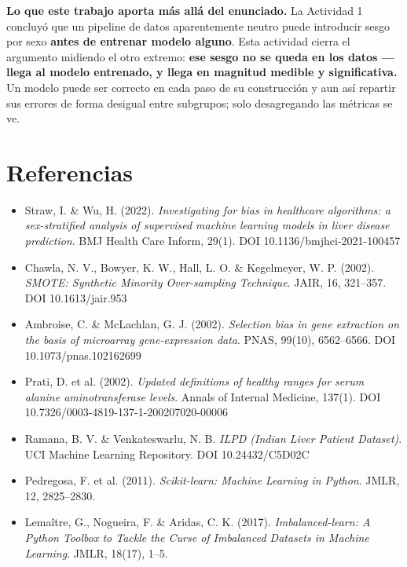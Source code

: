 \documentclass[10pt,a4paper]{article}
\begin{document}
\textbf{Lo que este trabajo aporta más allá del enunciado.} La Actividad 1 concluyó que un pipeline de datos aparentemente neutro puede introducir sesgo por sexo \textbf{antes de entrenar modelo alguno}. Esta actividad cierra el argumento midiendo el otro extremo: \textbf{ese sesgo no se queda en los datos --- llega al modelo entrenado, y llega en magnitud medible y significativa.} Un modelo puede ser correcto en cada paso de su construcción y aun así repartir sus errores de forma desigual entre subgrupos; solo desagregando las métricas se ve.

\section*{Referencias}
\small
\begin{itemize}
\item Straw, I. \& Wu, H. (2022). \textit{Investigating for bias in healthcare algorithms: a sex-stratified analysis of supervised machine learning models in liver disease prediction}. BMJ Health Care Inform, 29(1). DOI 10.1136/bmjhci-2021-100457
\item Chawla, N. V., Bowyer, K. W., Hall, L. O. \& Kegelmeyer, W. P. (2002). \textit{SMOTE: Synthetic Minority Over-sampling Technique}. JAIR, 16, 321--357. DOI 10.1613/jair.953
\item Ambroise, C. \& McLachlan, G. J. (2002). \textit{Selection bias in gene extraction on the basis of microarray gene-expression data}. PNAS, 99(10), 6562--6566. DOI 10.1073/pnas.102162699
\item Prati, D. et al. (2002). \textit{Updated definitions of healthy ranges for serum alanine aminotransferase levels}. Annals of Internal Medicine, 137(1). DOI 10.7326/0003-4819-137-1-200207020-00006
\item Ramana, B. V. \& Venkateswarlu, N. B. \textit{ILPD (Indian Liver Patient Dataset)}. UCI Machine Learning Repository. DOI 10.24432/C5D02C
\item Pedregosa, F. et al. (2011). \textit{Scikit-learn: Machine Learning in Python}. JMLR, 12, 2825--2830.
\item Lemaître, G., Nogueira, F. \& Aridas, C. K. (2017). \textit{Imbalanced-learn: A Python Toolbox to Tackle the Curse of Imbalanced Datasets in Machine Learning}. JMLR, 18(17), 1--5.
\end{itemize}
\normalsize

\end{document}
